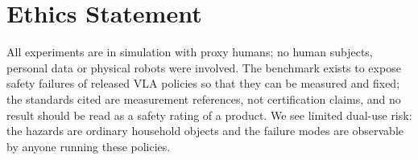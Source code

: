 \section*{Ethics Statement}


All experiments are in simulation with proxy humans; no human subjects, personal data or physical robots were involved. The benchmark exists to expose safety failures of released VLA policies so that they can be measured and fixed; the standards cited are measurement references, not certification claims, and no result should be read as a safety rating of a product. We see limited dual-use risk: the hazards are ordinary household objects and the failure modes are observable by anyone running these policies.

